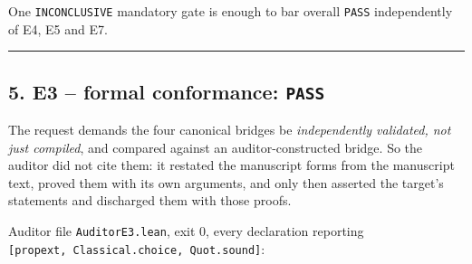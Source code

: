 \documentclass[
  10pt,
]{article}
\begin{document}
One \texttt{INCONCLUSIVE} mandatory gate is enough to bar overall
\texttt{PASS} independently of E4, E5 and E7.

\begin{center}\rule{0.5\linewidth}{0.5pt}\end{center}

\subsection{\texorpdfstring{5. E3 -- formal conformance:
\texttt{PASS}}{5. E3 -- formal conformance: PASS}}\label{e3-formal-conformance-pass}

The request demands the four canonical bridges be \emph{independently
validated, not just compiled}, and compared against an
auditor-constructed bridge. So the auditor did not cite them: it
restated the manuscript forms from the manuscript text, proved them with
its own arguments, and only then asserted the target's statements and
discharged them with those proofs.

Auditor file \texttt{AuditorE3.lean}, exit 0, every declaration
reporting \texttt{{[}propext,\ Classical.choice,\ Quot.sound{]}}:
\end{document}
